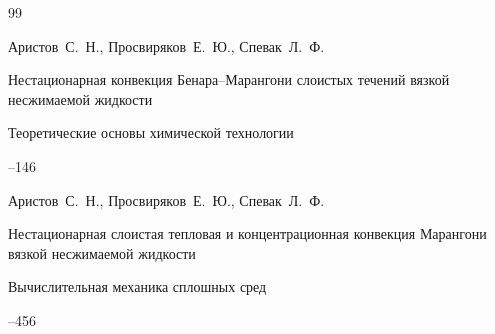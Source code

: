 \begin{thebibliography}{99}

\by  Аристов~С.~Н.,  Просвиряков~Е.~Ю.,  Спевак~Л.~Ф.

\paper Нестационарная конвекция Бенара–Марангони слоистых течений вязкой несжимаемой жидкости

\jour Теоретические основы химической технологии




--146




















\by  Аристов~С.~Н.,  Просвиряков~Е.~Ю.,  Спевак~Л.~Ф.

\paper Нестационарная слоистая тепловая и концентрационная конвекция Марангони вязкой несжимаемой жидкости

\jour Вычислительная механика сплошных сред




--456







\end{thebibliography}
